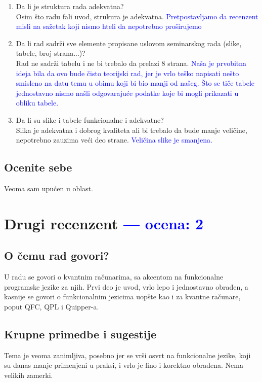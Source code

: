 \documentclass[a4paper]{report}
\newcommand{\odgovor}[1]{\textcolor{blue}{#1}}
\begin{document}
\begin{enumerate}
\item Da li je struktura rada adekvatna?\\
Osim što radu fali uvod, strukura je adekvatna.
\odgovor{Pretpostavljamo da recenzent misli na sažetak koji nismo hteli da nepotrebno proširujemo}
\item Da li rad sadrži sve elemente propisane uslovom seminarskog rada (slike, tabele, broj strana...)?\\
Rad ne sadrži tabelu i ne bi trebalo da prelazi 8 strana.
\odgovor {Naša je prvobitna ideja bila da ovo bude čisto teorijski rad, jer je vrlo teško napisati nešto smisleno na datu temu u obimu koji bi bio manji od našeg. Što se tiče tabele jednostavno nismo našli odgovarajuće podatke koje bi mogli prikazati u obliku tabele. }
\item Da li su slike i tabele funkcionalne i adekvatne?\\
Slika je adekvatna i dobrog kvaliteta ali bi trebalo da bude manje veličine, nepotrebno zauzima veći deo strane.
\odgovor {Veličina slike je smanjena.}
\end{enumerate}

\section{Ocenite sebe}

Veoma sam upućen u oblast.

\chapter{Drugi recenzent \odgovor{--- ocena: 2} }

\section{O čemu rad govori?}
U radu se govori o kvantnim računarima, sa akcentom na funkcionalne programske jezike za njih. 
Prvi deo je uvod, vrlo lepo i jednostavno obrađen, a kasnije se govori o 
funkcionalnim jezicima uopšte kao i za kvantne računare, poput QFC, QPL i Quipper-a. 

\section{Krupne primedbe i sugestije}
Tema je veoma zanimljiva, posebno jer se vrši osvrt na funkcionalne jezike, koji su danas manje 
primenjeni u praksi, i vrlo je fino i korektno obrađena. Nema velikih zamerki.
\end{document}
